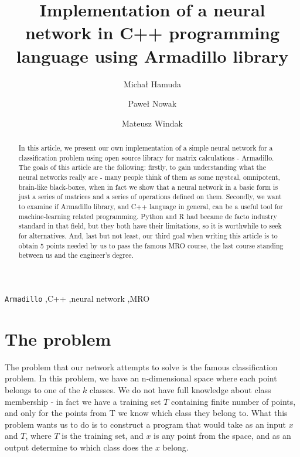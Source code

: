 \documentclass[3p,twocolumn]{elsarticle}
\begin{document}
\begin{frontmatter}

\title{Implementation of a neural network in C++ programming language using Armadillo library}

\author{Michał Hamuda}


\author{Paweł Nowak}

\author{Mateusz Windak}



\begin{abstract}
In this article, we present our own implementation of a simple neural network for a classification problem using open source library for matrix calculations - Armadillo. The goals of this article are the following: firstly, to gain understanding what the neural networks really are - many people think of them as some mystcal, omnipotent, brain-like black-boxes, when in fact we show that a neural network in a basic form is just a series of matrices and a series of operations defined on them. Secondly, we want to examine if Armadillo library, and C++ language in general, can be a useful tool for machine-learning related programming. Python and R had became de facto industry standard in that field, but they both have their limitations, so it is worthwhile to seek for alternatives. And, last but not least, our third goal when writing this article is to obtain 5 points needed by us to pass the famous MRO course, the last course standing between us and the engineer's degree.
\end{abstract}

\begin{keyword}
\texttt{Armadillo} \sep C++ \sep neural network \sep MRO
\end{keyword}

\end{frontmatter}


\section{The problem}

The problem that our network attempts to solve is the famous classification problem. In this problem, we have an n-dimensional space where each point belongs to one of the $k$ classes. We do not have full knowledge about class membership - in fact we have a training set $T$ containing finite number of points, and only for the points from T we know which class they belong to. What this problem wants us to do is to construct a program that would take as an input $x$ and $T$, where $T$ is the training set, and $x$ is any point from the space, and as an output determine to which class does the $x$ belong.
\end{document}
